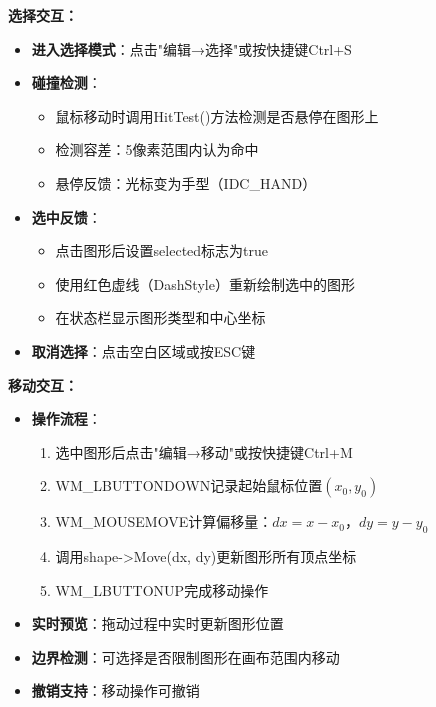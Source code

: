 \documentclass[12pt,a4paper]{article}
\begin{document}
\begin{tcolorbox}
\textbf{选择交互：}
\begin{itemize}
    \item \textbf{进入选择模式}：点击"编辑→选择"或按快捷键Ctrl+S
    \item \textbf{碰撞检测}：
    \begin{itemize}
        \item 鼠标移动时调用HitTest()方法检测是否悬停在图形上
        \item 检测容差：5像素范围内认为命中
        \item 悬停反馈：光标变为手型（IDC\_HAND）
    \end{itemize}
    \item \textbf{选中反馈}：
    \begin{itemize}
        \item 点击图形后设置selected标志为true
        \item 使用红色虚线（DashStyle）重新绘制选中的图形
        \item 在状态栏显示图形类型和中心坐标
    \end{itemize}
    \item \textbf{取消选择}：点击空白区域或按ESC键
\end{itemize}

\textbf{移动交互：}
\begin{itemize}
    \item \textbf{操作流程}：
    \begin{enumerate}
        \item 选中图形后点击"编辑→移动"或按快捷键Ctrl+M
        \item WM\_LBUTTONDOWN记录起始鼠标位置$(x_0, y_0)$
        \item WM\_MOUSEMOVE计算偏移量：$dx = x - x_0$，$dy = y - y_0$
        \item 调用shape->Move(dx, dy)更新图形所有顶点坐标
        \item WM\_LBUTTONUP完成移动操作
    \end{enumerate}
    \item \textbf{实时预览}：拖动过程中实时更新图形位置
    \item \textbf{边界检测}：可选择是否限制图形在画布范围内移动
    \item \textbf{撤销支持}：移动操作可撤销
\end{itemize}


\end{tcolorbox}
\end{document}
